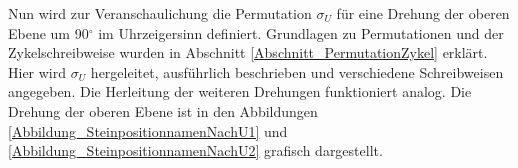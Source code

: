 \documentclass[12pt,a4paper, usenames, dvipsnames]{article}
\theoremstyle{mystyle}
\theoremstyle{definition}
\begin{document}
Nun wird zur Veranschaulichung die Permutation $\sigma_U$ für eine Drehung der oberen Ebene um 90$^\circ$ im Uhrzeigersinn definiert. Grundlagen zu Permutationen und der Zykelschreibweise wurden in Abschnitt \ref{Abschnitt_PermutationZykel} erklärt.
Hier wird $\sigma_U$ hergeleitet, ausführlich beschrieben und verschiedene Schreibweisen angegeben. Die Herleitung der weiteren Drehungen funktioniert analog. 
Die Drehung der oberen Ebene ist in den Abbildungen \ref{Abbildung_SteinpositionnamenNachU1} und \ref{Abbildung_SteinpositionnamenNachU2} grafisch dargestellt.

\end{document}
